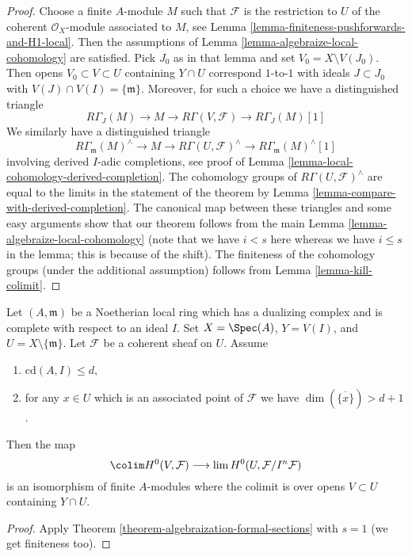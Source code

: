 \begin{proof}
Choose a finite $A$-module $M$ such that $\mathcal{F}$ is the
restriction to $U$ of the
coherent $\mathcal{O}_X$-module associated to $M$, see
Lemma \ref{lemma-finiteness-pushforwards-and-H1-local}.
Then the assumptions of
Lemma \ref{lemma-algebraize-local-cohomology}
are satisfied.
Pick $J_0$ as in that lemma and set $V_0 = X \setminus V(J_0)$.
Then opens $V_0 \subset V \subset U$ containing $Y \cap U$
correspond $1$-to-$1$ with ideals $J \subset J_0$ with
$V(J) \cap V(I) = \{\mathfrak m\}$.
Moreover, for such a choice we have a distinguished triangle
$$
R\Gamma_J(M) \to M \to R\Gamma(V, \mathcal{F}) \to
R\Gamma_J(M)[1]
$$
We similarly have a distinguished triangle
$$
R\Gamma_\mathfrak m(M)^\wedge \to
M \to
R\Gamma(U, \mathcal{F})^\wedge \to
R\Gamma_\mathfrak m(M)^\wedge[1]
$$
involving derived $I$-adic completions,
see proof of Lemma \ref{lemma-local-cohomology-derived-completion}.
The cohomology groups of $R\Gamma(U, \mathcal{F})^\wedge$ are
equal to the limits in the statement of the theorem by
Lemma \ref{lemma-compare-with-derived-completion}.
The canonical map between these triangles
and some easy arguments show that our
theorem follows from the main Lemma \ref{lemma-algebraize-local-cohomology}
(note that we have $i < s$ here whereas we have
$i \leq s$ in the lemma; this is because of the shift).
The finiteness of the cohomology groups
(under the additional assumption) follows from
Lemma \ref{lemma-kill-colimit}.
\end{proof}

\begin{lemma}
\label{lemma-application-theorem}
Let $(A, \mathfrak m)$ be a Noetherian local ring which has a
dualizing complex and is complete with respect to an ideal $I$.
Set $X = \Spec(A)$, $Y = V(I)$, and $U = X \setminus \{\mathfrak m\}$.
Let $\mathcal{F}$ be a coherent sheaf on $U$.
Assume
\begin{enumerate}
\item $\text{cd}(A, I) \leq d$,
\item for any $x \in U$ which is an associated point of $\mathcal{F}$
we have $\dim(\overline{\{x\}}) > d + 1$.
\end{enumerate}
Then the map
$$
\colim H^0(V, \mathcal{F})
\longrightarrow
\lim H^0(U, \mathcal{F}/I^n\mathcal{F})
$$
is an isomorphism of finite $A$-modules
where the colimit is over opens $V \subset U$
containing $Y \cap U$.
\end{lemma}

\begin{proof}
Apply Theorem \ref{theorem-algebraization-formal-sections} with $s = 1$
(we get finiteness too).
\end{proof}






